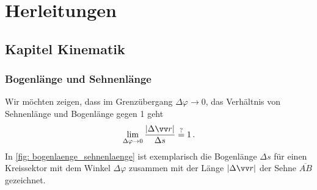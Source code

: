 
\chapter{Herleitungen}\label{chap: herleitungen}

\section{Kapitel Kinematik}\label{sec: herleitungen_kinematik}
\subsection{Bogenlänge und Sehnenlänge}\label{subsec: herleitung_bogenlaenge_sehnenlaenge}
Wir möchten zeigen, dass im Grenzübergang $\Delta \varphi \to 0$, das Verhältnis von Sehnenlänge und Bogenlänge gegen 1 geht
\begin{equation*}\label{eq: question_sehnenlänge_gleich_bogenlänge}
    \lim_{\Delta \varphi \to 0} \frac{|\Delta \ivec{r}|}{\Delta s} \eqquestion 1 \mDot
\end{equation*}
In \cref{fig: bogenlaenge_sehnenlaenge} ist exemplarisch die Bogenlänge $\Delta s$ für einen Kreissektor mit dem Winkel $\Delta \varphi$ zusammen mit der Länge $|\Delta \ivec{r}|$ der Sehne $\overline{AB}$ gezeichnet. 

